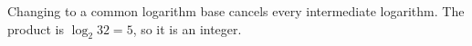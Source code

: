 Changing to a common logarithm base cancels every intermediate logarithm. The product is $\log_2 32=\boxed5$, so it is an integer.
